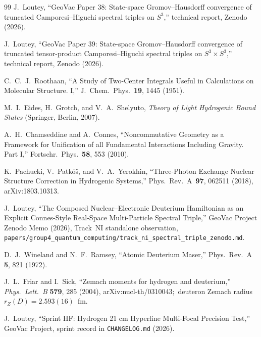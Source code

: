 \documentclass[twocolumn,prc,amsmath,amssymb,superscriptaddress]{revtex4-2}
\begin{document}
\begin{thebibliography}{99}
J.~Loutey, ``GeoVac Paper 38: State-space Gromov--Hausdorff convergence of truncated Camporesi--Higuchi spectral triples on $S^3$,'' technical report, Zenodo (2026).

J.~Loutey, ``GeoVac Paper 39: State-space Gromov--Hausdorff convergence
of truncated tensor-product Camporesi--Higuchi spectral triples on
$S^3 \times S^3$,'' technical report, Zenodo (2026).

C.~C.~J.~Roothaan,
``A Study of Two-Center Integrals Useful in Calculations on Molecular
Structure. I,''
J.~Chem.~Phys.~\textbf{19}, 1445 (1951).

M.~I.~Eides, H.~Grotch, and V.~A.~Shelyuto,
\emph{Theory of Light Hydrogenic Bound States}
(Springer, Berlin, 2007).


A.~H.~Chamseddine and A.~Connes,
``Noncommutative Geometry as a Framework for Unification of all
Fundamental Interactions Including Gravity. Part I,''
Fortschr.~Phys.~\textbf{58}, 553 (2010).

K.~Pachucki, V.~Patkó\v{s}, and V.~A.~Yerokhin,
``Three-Photon Exchange Nuclear Structure Correction in Hydrogenic
Systems,''
Phys.~Rev.~A~\textbf{97}, 062511 (2018), arXiv:1803.10313.

J.~Loutey, ``The Composed Nuclear--Electronic Deuterium Hamiltonian as
an Explicit Connes-Style Real-Space Multi-Particle Spectral Triple,''
GeoVac Project Zenodo Memo (2026), Track~NI standalone observation,
\texttt{papers/group4\_quantum\_computing/track\_ni\_spectral\_triple\_zenodo.md}.

D.~J.~Wineland and N.~F.~Ramsey,
``Atomic Deuterium Maser,''
Phys.~Rev.~A \textbf{5}, 821 (1972).

J.~L.~Friar and I.~Sick,
``Zemach moments for hydrogen and deuterium,''
\emph{Phys.~Lett.~B} \textbf{579}, 285 (2004), arXiv:nucl-th/0310043;\
deuteron Zemach radius $r_Z(D) = 2.593(16)$~fm.

J.~Loutey, ``Sprint HF: Hydrogen 21 cm Hyperfine Multi-Focal Precision
Test,'' GeoVac Project, sprint record in \texttt{CHANGELOG.md} (2026).

\end{thebibliography}
\end{document}

